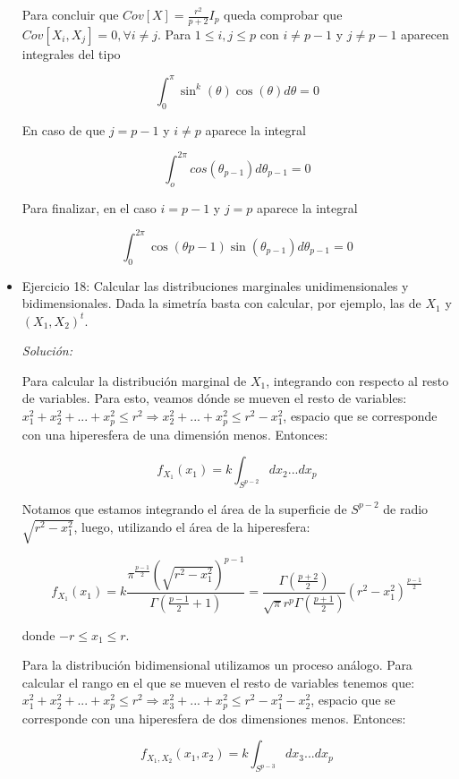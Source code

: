 \documentclass{article}
\theoremstyle{theorem-style}  %
\theoremstyle{definition}
\theoremstyle{example-style}
\begin{document}
\begin{itemize}
\begin{itemize}
		\end{itemize}
	
		Para concluir que $Cov[X] = \frac{r^2}{p+2}I_p$ queda comprobar que $Cov[X_i, X_j] = 0, \forall i \ne j$. Para $1 \leq i,j \leq p$ con $i \ne p-1$ y $j \ne p-1$ aparecen integrales del tipo
		
		\[
			\int_{0}^{\pi} \sin^k(\theta) \cos(\theta)d\theta = 0
		\]
		
		En caso de que $j = p-1$ y $i \ne p$ aparece la integral 
		
		\[
			\int_{o}^{2 \pi} cos(\theta_{p-1}) d\theta_{p-1} = 0
		\]
		
		Para finalizar, en el caso $i = p-1$ y $j = p$ aparece la integral
		
		\[
			\int_{0}^{2 \pi} \cos(\theta{p-1}) \sin(\theta_{p-1}) d\theta_{p-1} = 0
 		\] 
		
		\item Ejercicio 18: Calcular las distribuciones marginales unidimensionales y bidimensionales. Dada la simetría basta con calcular, por ejemplo, las de $X_1$ y $(X_1,X_2)^t$.
		
		\textit{Solución:}
		
		Para calcular la distribución marginal de $X_1$, integrando con respecto al resto de variables. Para esto, veamos dónde se mueven el resto de variables: $x_1^2 + x_2^2 + ... + x_p^2 \leq r^2 \Rightarrow  x_2^2 + ... + x_p^2  \leq r^2 - x_1^2$, espacio que se corresponde con una hiperesfera de una dimensión menos. Entonces:
		
		\[
			f_{X_1}(x_1) = k \int_{S^{p-2}} dx_2 ... dx_p 
		\]
		
		Notamos que estamos integrando el área de la superficie de $S^{p-2}$ de radio $\sqrt{r^2 - x_1^2}$, luego, utilizando el área de la hiperesfera: 
		
		\[
				f_{X_1}(x_1) = k \frac{\pi ^{\frac{p-1}{2}}  (\sqrt{r^2 - x_1^2})^{p-1}}{\Gamma(\frac{p-1}{2} + 1)} = \frac{\Gamma(\frac{p+2}{2})}{\sqrt{\pi} r^p \Gamma(\frac{p+1}{2})} (r^2 - x_1^2)^{\frac{p-1}{2}}
		\]
		
		donde $-r \leq x_1 \leq r$.
		
		
		Para la distribución bidimensional utilizamos un proceso análogo. Para calcular el rango en el que se mueven el resto de variables tenemos que: $x_1^2 + x_2^2 + ... + x_p^2 \leq r^2 \Rightarrow  x_3^2 + ... + x_p^2  \leq r^2 - x_1^2 - x_2^2$, espacio que se corresponde con una hiperesfera de dos dimensiones menos. Entonces:
		
		\[
			f_{X_1, X_2}(x_1, x_2) = k \int_{S^{p-3}} dx_3 ... dx_p
		\]
		

\end{itemize}
\end{document}
